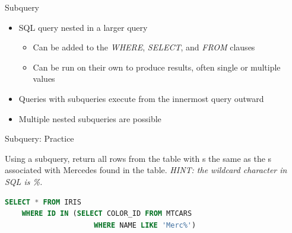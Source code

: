\documentclass{beamer}
\begin{document}
\begin{frame}[fragile]{Subquery}
\begin{itemize}
  \item SQL query nested in a larger query
  \begin{itemize}
    \item Can be added to the \textit{WHERE}, \textit{SELECT}, and \textit{FROM} clauses
    \item Can be run on their own to produce results, often single or multiple values
  \end{itemize}
  \item Queries with subqueries execute from the innermost query outward
  \item Multiple nested subqueries are possible
\end{itemize}
\vspace{0.5em}
\centering
{}
\end{frame}

\begin{frame}[fragile]{Subquery: Practice}
\begin{prob}
Using a subquery, return all rows from the  table with s the same as
the s associated with Mercedes found in the  table.
\textit{HINT: the wildcard character in SQL is \%.}
\end{prob}
\pause
\vspace{0.5em}
\textbf{}
\begin{lstlisting}[language=SQL]
SELECT * FROM IRIS
    WHERE ID IN (SELECT COLOR_ID FROM MTCARS
                     WHERE NAME LIKE 'Merc%')
\end{lstlisting}
\end{frame}
\end{document}
